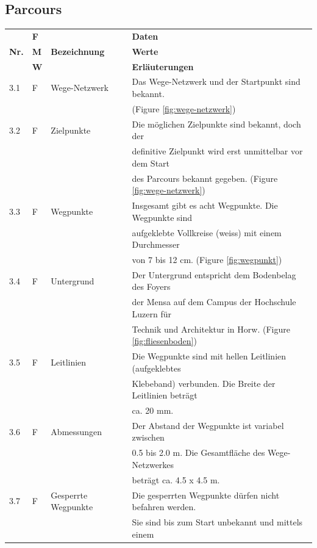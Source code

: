 \documentclass[../main.tex]{subfiles}
\begin{document}
\subsection{Parcours}
\begin{tabular}{|l|l|l|l|}
  \hline
  & \textbf{F} & & \textbf{Daten} \\
  \textbf{Nr.} & \textbf{M} & \textbf{Bezeichnung} & \textbf{Werte} \\
  & \textbf{W} & & \textbf{Erläuterungen} \\
  \hline
  3.1 & F & Wege-Netzwerk & Das Wege-Netzwerk und der Startpunkt sind
  bekannt. \\
  & & & (Figure \ref{fig:wege-netzwerk}) \\
  \hline
  3.2 & F & Zielpunkte & Die möglichen Zielpunkte sind bekannt, doch der \\
  & & & definitive Zielpunkt wird erst unmittelbar vor dem Start \\
  & & & des Parcours bekannt gegeben. (Figure \ref{fig:wege-netzwerk}) \\
  \hline
  3.3 & F & Wegpunkte & Insgesamt gibt es acht Wegpunkte. Die Wegpunkte sind \\
  & & & aufgeklebte Vollkreise (weiss) mit einem Durchmesser \\
  & & & von 7 bis 12 cm. (Figure \ref{fig:wegpunkt}) \\
  \hline
  3.4 & F & Untergrund & Der Untergrund entspricht dem Bodenbelag des Foyers \\
  & & & der Mensa auf dem Campus der Hochschule Luzern für \\
  & & & Technik und Architektur in Horw. (Figure \ref{fig:fliesenboden}) \\
  \hline
  3.5 & F & Leitlinien & Die Wegpunkte sind mit hellen Leitlinien
  (aufgeklebtes \\
  & & & Klebeband) verbunden. Die Breite der Leitlinien beträgt \\
  & & & ca. 20 mm. \\
  \hline
  3.6 & F & Abmessungen & Der Abstand der Wegpunkte ist variabel zwischen \\
  & & & 0.5 bis 2.0 m. Die Gesamtfläche des Wege-Netzwerkes \\
  & & & beträgt ca. 4.5 x 4.5 m. \\
  \hline
  3.7 & F &  Gesperrte Wegpunkte & Die gesperrten Wegpunkte dürfen
  nicht befahren werden. \\
  & & & Sie sind bis zum Start unbekannt und mittels einem \\

\end{tabular}
\end{document}

